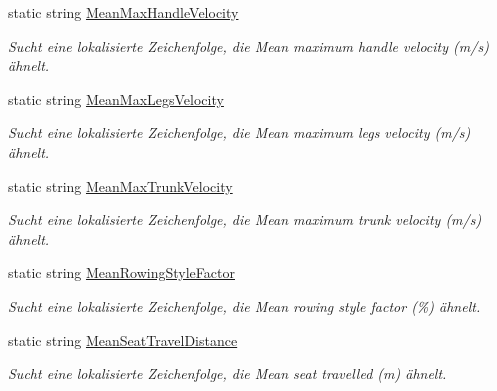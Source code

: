 \begin{DoxyCompactItemize}
static string \hyperlink{class_rowing_monitor_1_1_properties_1_1_resources_a9259f46ec2e511e16397345db30b083c}{Mean\+Max\+Handle\+Velocity}
\begin{DoxyCompactList}\small\item\em Sucht eine lokalisierte Zeichenfolge, die Mean maximum handle velocity (m/s) ähnelt. \end{DoxyCompactList}\item 
static string \hyperlink{class_rowing_monitor_1_1_properties_1_1_resources_a2254769cd88372fb92595fc59c36e0ad}{Mean\+Max\+Legs\+Velocity}
\begin{DoxyCompactList}\small\item\em Sucht eine lokalisierte Zeichenfolge, die Mean maximum legs velocity (m/s) ähnelt. \end{DoxyCompactList}\item 
static string \hyperlink{class_rowing_monitor_1_1_properties_1_1_resources_ae8925670637fe28af1a497d4d9e99f1f}{Mean\+Max\+Trunk\+Velocity}
\begin{DoxyCompactList}\small\item\em Sucht eine lokalisierte Zeichenfolge, die Mean maximum trunk velocity (m/s) ähnelt. \end{DoxyCompactList}\item 
static string \hyperlink{class_rowing_monitor_1_1_properties_1_1_resources_a6a72ee7d9006274b2c616410c5dc89bf}{Mean\+Rowing\+Style\+Factor}
\begin{DoxyCompactList}\small\item\em Sucht eine lokalisierte Zeichenfolge, die Mean rowing style factor (\%) ähnelt. \end{DoxyCompactList}\item 
static string \hyperlink{class_rowing_monitor_1_1_properties_1_1_resources_ac34d72eb29be8388d7d551b906bf0995}{Mean\+Seat\+Travel\+Distance}
\begin{DoxyCompactList}\small\item\em Sucht eine lokalisierte Zeichenfolge, die Mean seat travelled (m) ähnelt. \end{DoxyCompactList}\item 

\end{DoxyCompactItemize}
